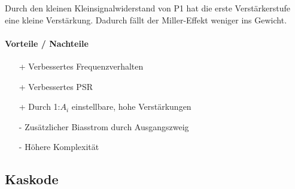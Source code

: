 \begin{minipage}[t]{0.66\columnwidth}
    Durch den kleinen Kleinsignalwiderstand von P1 hat die erste Verstärkerstufe eine kleine Verstärkung. 
    Dadurch fällt der Miller-Effekt weniger ins Gewicht.

    \paragraph{Vorteile / Nachteile}
    \raggedright

     \begin{itemize}
        \item[+] Verbessertes Frequenzverhalten
        \item[+] Verbessertes PSR
        \item[+] Durch 1:$A_i$ einstellbare, hohe Verstärkungen
        \item[-] Zusätzlicher Biasstrom durch Ausgangszweig
        \item[-] Höhere Komplexität 
     \end{itemize}

\end{minipage}


\subsection{Kaskode}

